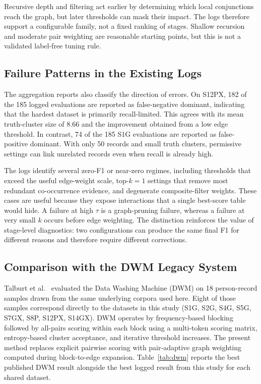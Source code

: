\documentclass[conference]{IEEEtran}
\begin{document}
Recursive depth and filtering act earlier by determining which local conjunctions reach the graph, but later thresholds can mask their impact. The logs therefore support a configurable family, not a fixed ranking of stages. Shallow recursion and moderate pair weighting are reasonable starting points, but this is not a validated label-free tuning rule.

\subsection{Failure Patterns in the Existing Logs}
The aggregation reports also classify the direction of errors. On S12PX, 182 of the 185 logged evaluations are reported as false-negative dominant, indicating that the hardest dataset is primarily recall-limited. This agrees with its mean truth-cluster size of 8.66 and the improvement obtained from a low edge threshold. In contrast, 74 of the 185 S1G evaluations are reported as false-positive dominant. With only 50 records and small truth clusters, permissive settings can link unrelated records even when recall is already high.

The logs identify several zero-F1 or near-zero regimes, including thresholds that exceed the useful edge-weight scale, top-$k=1$ settings that remove most redundant co-occurrence evidence, and degenerate composite-filter weights. These cases are useful because they expose interactions that a single best-score table would hide. A failure at high $\tau$ is a graph-pruning failure, whereas a failure at very small $k$ occurs before edge weighting. The distinction reinforces the value of stage-level diagnostics: two configurations can produce the same final F1 for different reasons and therefore require different corrections.

\subsection{Comparison with the DWM Legacy System}
Talburt et al.~\cite{talburt2020} evaluated the Data Washing Machine (DWM) on 18 person-record samples drawn from the same underlying corpora used here. Eight of those samples correspond directly to the datasets in this study (S1G, S2G, S4G, S5G, S7GX, S8P, S12PX, S14GX). DWM operates by frequency-based blocking followed by all-pairs scoring within each block using a multi-token scoring matrix, entropy-based cluster acceptance, and iterative threshold increases. The present method replaces explicit pairwise scoring with pair-adaptive graph weighting computed during block-to-edge expansion. Table~\ref{tab:dwm} reports the best published DWM result alongside the best logged result from this study for each shared dataset.
\end{document}

